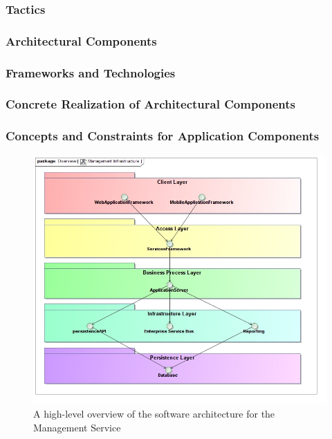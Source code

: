 \subsubsection{Tactics}
\subsubsection{Architectural Components}
\subsubsection{Frameworks and Technologies}
\subsubsection{Concrete Realization of Architectural Components}
\subsubsection{Concepts and Constraints for Application Components}

\begin{figure}[H]
  \begin{center}
  \includegraphics[scale=0.4]{../Diagrams and Charts/Overview/ManagementInfrastructure.jpg}
  \caption{A high-level overview of the software architecture for the Management Service}
  \label{fig:managementInfrastructure}
  \end{center}
\end{figure}

